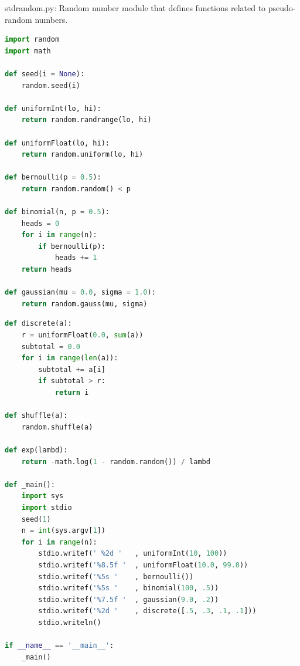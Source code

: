\documentclass[8pt,a4paper,compress]{beamer}
\begin{document}
\begin{frame}[fragile]
\pause

\begin{framed}
\tiny stdrandom.py: Random number module that defines functions related to pseudo-random numbers.
\end{framed}

\begin{lstlisting}[language=Python]
import random
import math

def seed(i = None):
    random.seed(i)

def uniformInt(lo, hi):
    return random.randrange(lo, hi)
    
def uniformFloat(lo, hi):
    return random.uniform(lo, hi)

def bernoulli(p = 0.5):
    return random.random() < p

def binomial(n, p = 0.5):
    heads = 0
    for i in range(n):
        if bernoulli(p):
            heads += 1
    return heads
    
def gaussian(mu = 0.0, sigma = 1.0):
    return random.gauss(mu, sigma)
\end{lstlisting}
\end{frame}

\begin{frame}[fragile]
\pause

\begin{lstlisting}[language=Python]
def discrete(a):
    r = uniformFloat(0.0, sum(a))
    subtotal = 0.0
    for i in range(len(a)):
        subtotal += a[i]
        if subtotal > r:
            return i

def shuffle(a):
    random.shuffle(a)

def exp(lambd):
    return -math.log(1 - random.random()) / lambd
    
def _main():
    import sys
    import stdio
    seed(1)
    n = int(sys.argv[1])
    for i in range(n):
        stdio.writef(' %2d '   , uniformInt(10, 100))
        stdio.writef('%8.5f '  , uniformFloat(10.0, 99.0))
        stdio.writef('%5s '    , bernoulli())
        stdio.writef('%5s '    , binomial(100, .5))
        stdio.writef('%7.5f '  , gaussian(9.0, .2))
        stdio.writef('%2d '    , discrete([.5, .3, .1, .1]))
        stdio.writeln()

if __name__ == '__main__':
    _main()
\end{lstlisting}
\end{frame}
\end{document}

